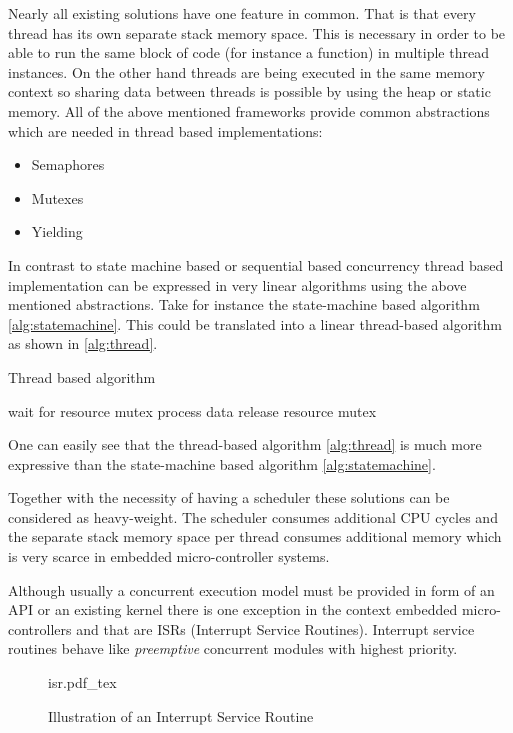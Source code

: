 Nearly all existing solutions have one feature in common. That is that every thread has its own separate stack memory space. This is necessary in order to be able to run the same block of code (for instance a function) in multiple thread instances. On the other hand threads are being executed in the same memory context so sharing data between threads is possible by using the heap or static memory. All of the above mentioned frameworks provide common abstractions which are needed in thread based implementations:

\begin{itemize}
\item Semaphores
\item Mutexes
\item Yielding
\end{itemize}

In contrast to state machine based or sequential based concurrency thread based implementation can be expressed in very linear algorithms using the above mentioned abstractions. Take for instance the state-machine based algorithm \ref{alg:statemachine}. This could be translated into a linear thread-based algorithm as shown in \ref{alg:thread}.

\begin{algorithm}[H]
\caption{Thread based algorithm}
\label{alg:thread}
\begin{algorithmic}
    \STATE wait for resource mutex
    \STATE process data
    \STATE release resource mutex
\ENDWHILE
\end{algorithmic}
\end{algorithm}

One can easily see that the thread-based algorithm \ref{alg:thread} is much more expressive than the state-machine based algorithm \ref{alg:statemachine}.

Together with the necessity of having a scheduler these solutions can be considered as heavy-weight. The scheduler consumes additional CPU cycles and the separate stack memory space per thread consumes additional memory which is very scarce in embedded micro-controller systems.

Although usually a concurrent execution model must be provided in form of an API or an existing kernel there is one exception in the context embedded micro-controllers and that are ISRs (Interrupt Service Routines). Interrupt service routines behave like \emph{preemptive} concurrent modules with highest priority.

\begin{figure}[H]
\centering
{isr.pdf_tex}
\caption{Illustration of an Interrupt Service Routine}
\end{figure}

